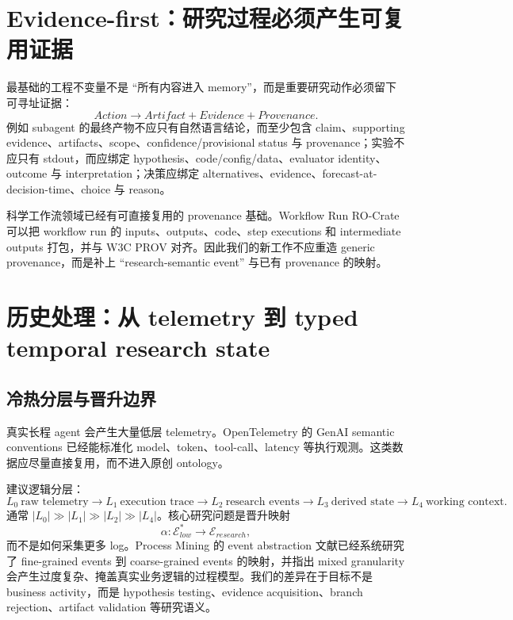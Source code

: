 \documentclass[11pt,a4paper]{ctexart}
\begin{document}
\section{Evidence-first：研究过程必须产生可复用证据}

最基础的工程不变量不是 ``所有内容进入 memory''，而是重要研究动作必须留下可寻址证据：
\begin{equation}
\boxed{Action\to Artifact+Evidence+Provenance.}
\end{equation}
例如 subagent 的最终产物不应只有自然语言结论，而至少包含 claim、supporting evidence、artifacts、scope、confidence/provisional status 与 provenance；实验不应只有 stdout，而应绑定 hypothesis、code/config/data、evaluator identity、outcome 与 interpretation；决策应绑定 alternatives、evidence、forecast-at-decision-time、choice 与 reason。

科学工作流领域已经有可直接复用的 provenance 基础。Workflow Run RO-Crate 可以把 workflow run 的 inputs、outputs、code、step executions 和 intermediate outputs 打包，并与 W3C PROV 对齐\cite{soiland2024wfrun}。因此我们的新工作不应重造 generic provenance，而是补上 ``research-semantic event'' 与已有 provenance 的映射。

\section{历史处理：从 telemetry 到 typed temporal research state}

\subsection{冷热分层与晋升边界}
真实长程 agent 会产生大量低层 telemetry。OpenTelemetry 的 GenAI semantic conventions 已经能标准化 model、token、tool-call、latency 等执行观测\cite{otel2026genai,opentelemetry2026inside}。这类数据应尽量直接复用，而不进入原创 ontology。

建议逻辑分层：
\begin{equation}
\boxed{
L_0\ \text{raw telemetry}
\to L_1\ \text{execution trace}
\to L_2\ \text{research events}
\to L_3\ \text{derived state}
\to L_4\ \text{working context}.}
\end{equation}
通常 $|L_0|\gg|L_1|\gg|L_2|\gg|L_4|$。核心研究问题是晋升映射
\begin{equation}
\alpha:\mathcal E_{low}^{*}\to\mathcal E_{research},
\end{equation}
而不是如何采集更多 log。Process Mining 的 event abstraction 文献已经系统研究了 fine-grained events 到 coarse-grained events 的映射，并指出 mixed granularity 会产生过度复杂、掩盖真实业务逻辑的过程模型\cite{vanzelst2021abstraction}。我们的差异在于目标不是 business activity，而是 hypothesis testing、evidence acquisition、branch rejection、artifact validation 等研究语义。
\end{document}
